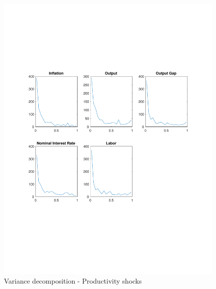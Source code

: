 \documentclass[12pt]{article}
\theoremstyle{definition}
\begin{document}
\begin{figure}[H]
	\centering
	\includegraphics[width=\linewidth, height = 0.4\textheight]{var_prod}
	\caption{Variance decomposition - Productivity shocks}
	\label{fig:var_prod}
\end{figure}
\end{document}
